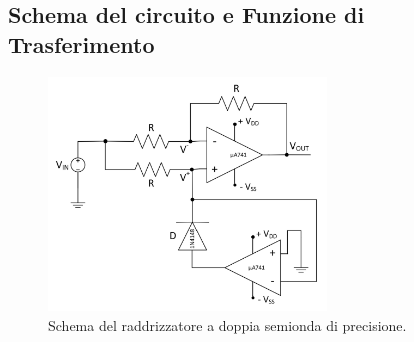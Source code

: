\documentclass{report}
\begin{document}
\subsection{Schema del circuito e Funzione di Trasferimento}
\begin{figure}[h]
	\centering
	\includegraphics[height=6.2cm]{immagini/schema1}
	\caption{Schema del raddrizzatore a doppia semionda di precisione.}
	\label{figura:schema1}
\end{figure}
\end{document}
